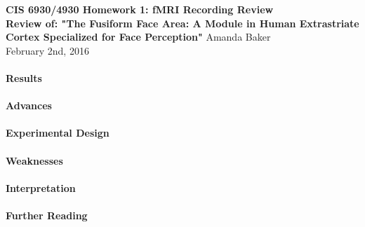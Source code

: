 \documentclass[11pt]{article}
\begin{document}
\begin{center}
{\large {\bf CIS 6930/4930 Homework 1: fMRI Recording Review}}\\
{\normalsize {\bf Review of: "The Fusiform Face Area: A Module in Human Extrastriate Cortex
Specialized for Face Perception"}}
Amanda Baker \\
February 2nd, 2016 \\
\end{center}

\paragraph{Results}


\paragraph{Advances}


\paragraph{Experimental Design}


\paragraph{Weaknesses}


\paragraph{Interpretation}


\paragraph{Further Reading}
\end{document}
